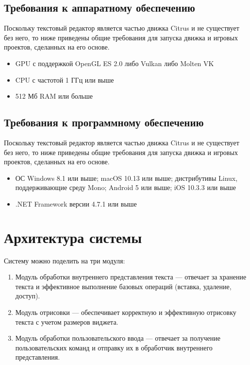 \documentclass{fefu}
\begin{document}
		\subsection{Требования к аппаратному обеспечению}
			\par Поскольку текстовый редактор является частью движка Citrus и не существует 
			без него, то ниже приведены общие требования для запуска движка и игровых проектов,
			сделанных на его основе.
			\begin{itemize}
				\item GPU с поддержкой OpenGL ES 2.0 либо Vulkan либо Molten VK
				\item CPU с частотой 1 ГГц или выше
				\item 512 Мб RAM или больше
			\end{itemize}
		\subsection{Требования к программному обеспечению}
			\par Поскольку текстовый редактор является частью движка Citrus и не существует 
			без него, то ниже приведены общие требования для запуска движка и игровых проектов,
			сделанных на его основе.
			\begin{itemize}
				\item ОС Windows 8.1 или выше; macOS 10.13 или выше; дистрибутивы 
				Linux, поддерживающие среду Mono; Android 5 или выше; iOS 10.3.3 или выше
				\item .NET Framework версии 4.7.1 или выше
			\end{itemize}
	\section{Архитектура системы}
		\par Систему можно поделить на три модуля:
		\begin{enumerate}
			\item Модуль обработки внутреннего представления текста --- отвечает за хранение
			текста и эффективное выполнение базовых операций (вставка, удаление, доступ).
			\item Модуль отрисовки --- обеспечивает корректную и эффективную отрисовку текста
			с учетом размеров виджета.
			\item Модуль обработки пользовательского ввода --- отвечает за получение
			пользовательских команд и отправку их в обработчик внутреннего представления.
		\end{enumerate}
\end{document}

